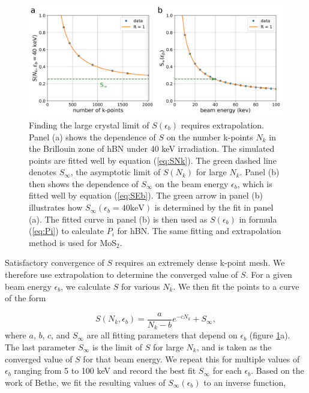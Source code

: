 \documentclass{article}
\begin{document}
\begin{figure}[H]
  \centering
  \includegraphics[width=\textwidth]{figures/sum.pdf}
  \caption{
    Finding the large crystal limit of $S(\epsilon_b)$ requires extrapolation.
    Panel (a) shows the dependence of $S$ on the number k-points $N_k$ in the
    Brillouin zone of hBN under 40 keV irradiation.
    The simulated points are fitted well by equation (\ref{eq:SNk}).
    The green dashed line denotes $S_\infty$, the asymptotic limit of $S(N_k)$
    for large $N_k$.
    Panel (b) then shows the dependence of $S_\infty$ on the beam energy
    $\epsilon_b$, which is fitted well by equation (\ref{eq:SEb}).
    The green arrow in panel (b) illustrates how $S_\infty(\epsilon_b=40\text{
    keV})$ is determined by the fit in panel (a).
    The fitted curve in panel (b) is then used as $S(\epsilon_b)$ in formula
    (\ref{eq:Pi}) to calculate $P_i$ for hBN.
    The same fitting and extrapolation method is used for MoS$_2$.
  }
  \label{fig:Sfit}
\end{figure}

Satisfactory convergence of $S$ requires an extremely dense k-point mesh.
We therefore use extrapolation to determine the converged value of $S$.
For a given beam energy $\epsilon_b$, we calculate $S$ for various $N_k$.
We then fit the points to a curve of the form

\begin{equation}
  S(N_k, \epsilon_b)
  =
  \frac{a}{N_k-b}e^{-cN_k} + S_\infty,
  \label{eq:SNk}
\end{equation}
%
where $a$, $b$, $c$, and $S_\infty$ are all fitting parameters that depend on
$\epsilon_b$ (figure \ref{fig:Sfit}a).
The last parameter $S_\infty$ is the limit of $S$ for large $N_k$, and is taken
as the converged value of $S$ for that beam energy.
We repeat this for multiple values of $\epsilon_b$ ranging from 5 to 100 keV
and record the best fit
$S_\infty$ for each
$\epsilon_b$.
Based on the work of Bethe,\cite{Bethe1930, Susi2019, Kretschmer2020} we fit
the resulting values of $S_\infty(\epsilon_b)$ to an inverse function,
\end{document}
